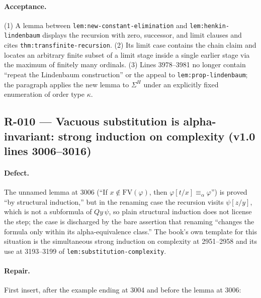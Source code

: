\paragraph{Acceptance.}
(1) A lemma between \texttt{lem:new-constant-elimination} and
\texttt{lem:henkin-lindenbaum} displays the recursion with zero, successor, and
limit clauses and cites \texttt{thm:transfinite-recursion}.  (2) Its limit case
contains the chain claim and locates an arbitrary finite subset of a limit
stage inside a single earlier stage via the maximum of finitely many ordinals.
(3) Lines 3978--3981 no longer contain ``repeat the Lindenbaum construction''
or the appeal to \texttt{lem:prop-lindenbaum}; the paragraph applies the new
lemma to \(\Sigma^{H}\) under an explicitly fixed enumeration of order type
\(\kappa\).

\subsection*{R-010 --- Vacuous substitution is alpha-invariant: strong induction on complexity (v1.0 lines 3006--3016)}

\paragraph{Defect.}
The unnamed lemma at 3006 (``If \(x\notin\mathrm{FV}(\varphi)\), then
\(\varphi[t/x]\equiv_\alpha\varphi\)'') is proved ``by structural induction,''
but in the renaming case the recursion visits \(\psi[z/y]\), which is not a
subformula of \(Qy\,\psi\), so plain structural induction does not license the
step; the case is discharged by the bare assertion that renaming ``changes the
formula only within its alpha-equivalence class.''  The book's own template for
this situation is the simultaneous strong induction on complexity at 2951--2958
and its use at 3193--3199 of \texttt{lem:substitution-complexity}.

\paragraph{Repair.}
First insert, after the example ending at 3004 and before the lemma at 3006:

